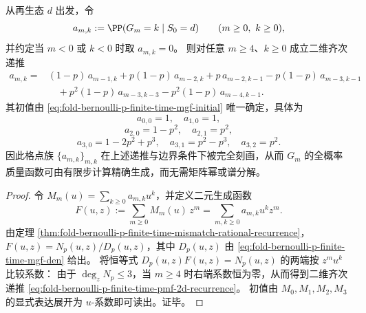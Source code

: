 \begin{theorem}\label{thm:fold-bernoulli-p-finite-time-pmf-2d-recurrence}
从再生态 \(d\) 出发，令
\[
a_{m,k}:=\PP(G_m=k\mid S_0=d)\qquad(m\ge 0,\ k\ge 0),
\]
并约定当 \(m<0\) 或 \(k<0\) 时取 \(a_{m,k}=0\)。
则对任意 \(m\ge 4\)、\(k\ge 0\) 成立二维齐次递推
\begin{equation}\label{eq:fold-bernoulli-p-finite-time-pmf-2d-recurrence}
\begin{aligned}
a_{m,k}={}&(1-p)\,a_{m-1,k}
+p(1-p)\,a_{m-2,k}
+p\,a_{m-2,k-1}
-p(1-p)\,a_{m-3,k-1}\\
&\quad
+p^{2}(1-p)\,a_{m-3,k-3}
-p^{2}(1-p)\,a_{m-4,k-1}.
\end{aligned}
\end{equation}
其初值由 \eqref{eq:fold-bernoulli-p-finite-time-mgf-initial} 唯一确定，具体为
\[
a_{0,0}=1,\quad a_{1,0}=1,
\]
\[
a_{2,0}=1-p^{2},\quad a_{2,1}=p^{2},
\]
\[
a_{3,0}=1-2p^{2}+p^{3},\quad a_{3,1}=p^{2}-p^{3},\quad a_{3,2}=p^{2}.
\]
因此格点族 \(\{a_{m,k}\}_{m,k}\) 在上述递推与边界条件下被完全刻画，从而 \(G_m\) 的全概率质量函数可由有限步计算精确生成，而无需矩阵幂或谱分解。
\end{theorem}
\begin{proof}
令
\(
M_m(u)=\sum_{k\ge 0}a_{m,k}u^{k}
\)，并定义二元生成函数
\[
F(u,z):=\sum_{m\ge 0}M_m(u)\,z^{m}
=\sum_{m,k\ge 0}a_{m,k}u^{k}z^{m}.
\]
由定理 \ref{thm:fold-bernoulli-p-finite-time-mismatch-rational-recurrence}，
\(
F(u,z)=N_p(u,z)/D_p(u,z)
\)，其中 \(D_p(u,z)\) 由 \eqref{eq:fold-bernoulli-p-finite-time-mgf-den} 给出。
将恒等式 \(D_p(u,z)F(u,z)=N_p(u,z)\) 的两端按 \(z^{m}u^{k}\) 比较系数：
由于 \(\deg_z N_p\le 3\)，当 \(m\ge 4\) 时右端系数恒为零，从而得到二维齐次递推 \eqref{eq:fold-bernoulli-p-finite-time-pmf-2d-recurrence}。
初值由 \(M_0,M_1,M_2,M_3\) 的显式表达展开为 \(u\)-系数即可读出。证毕。
\end{proof}









